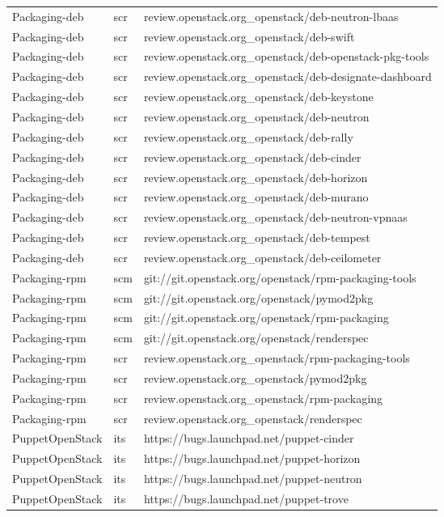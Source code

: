 \begin{center}
\begin{longtable}{|p{4cm}|p{1cm}|p{10cm}|}
Packaging-deb&scr&review.openstack.org\_openstack/deb-neutron-lbaas\\ 
Packaging-deb&scr&review.openstack.org\_openstack/deb-swift\\ 
Packaging-deb&scr&review.openstack.org\_openstack/deb-openstack-pkg-tools\\ 
Packaging-deb&scr&review.openstack.org\_openstack/deb-designate-dashboard\\ 
Packaging-deb&scr&review.openstack.org\_openstack/deb-keystone\\ 
Packaging-deb&scr&review.openstack.org\_openstack/deb-neutron\\ 
Packaging-deb&scr&review.openstack.org\_openstack/deb-rally\\ 
Packaging-deb&scr&review.openstack.org\_openstack/deb-cinder\\ 
Packaging-deb&scr&review.openstack.org\_openstack/deb-horizon\\ 
Packaging-deb&scr&review.openstack.org\_openstack/deb-murano\\ 
Packaging-deb&scr&review.openstack.org\_openstack/deb-neutron-vpnaas\\ 
Packaging-deb&scr&review.openstack.org\_openstack/deb-tempest\\ 
Packaging-deb&scr&review.openstack.org\_openstack/deb-ceilometer\\ 
Packaging-rpm&scm&git://git.openstack.org/openstack/rpm-packaging-tools\\ 
Packaging-rpm&scm&git://git.openstack.org/openstack/pymod2pkg\\ 
Packaging-rpm&scm&git://git.openstack.org/openstack/rpm-packaging\\ 
Packaging-rpm&scm&git://git.openstack.org/openstack/renderspec\\ 
Packaging-rpm&scr&review.openstack.org\_openstack/rpm-packaging-tools\\ 
Packaging-rpm&scr&review.openstack.org\_openstack/pymod2pkg\\ 
Packaging-rpm&scr&review.openstack.org\_openstack/rpm-packaging\\ 
Packaging-rpm&scr&review.openstack.org\_openstack/renderspec\\ 
PuppetOpenStack&its&https://bugs.launchpad.net/puppet-cinder\\ 
PuppetOpenStack&its&https://bugs.launchpad.net/puppet-horizon\\ 
PuppetOpenStack&its&https://bugs.launchpad.net/puppet-neutron\\ 
PuppetOpenStack&its&https://bugs.launchpad.net/puppet-trove\\ 

\end{longtable}
\end{center}
